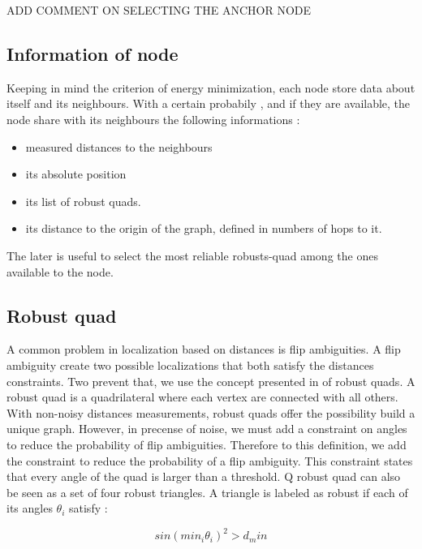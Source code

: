 \documentclass[letterpaper, 10 pt, conference]{ieeeconf}  %
\begin{document}
ADD COMMENT ON SELECTING THE ANCHOR NODE

\subsection{Information of node}

Keeping in mind the criterion of energy minimization, each node store data about itself and its neighbours. With a certain probabily , and if they are available, the node share with its neighbours the following informations :

\begin{itemize}

\item measured distances to the neighbours
\item its absolute position
\item its list of robust quads.
\item its distance to the origin of the graph, defined in numbers of hops to it.

\end{itemize}

The later is useful to select the most reliable robusts-quad among the ones available to the node.


\subsection{Robust quad}
A common problem in localization based on distances is flip ambiguities. A flip ambiguity create two possible localizations that both satisfy the distances constraints. Two prevent that, we use the concept presented in \cite{MooreTeller} of robust quads.
A robust quad is a quadrilateral where each vertex are connected with all others.
With non-noisy distances measurements, robust quads offer the possibility build a unique graph. However, in precense of noise, we must add a constraint on angles to reduce the probability of flip ambiguities.
Therefore to this definition, we add the constraint to reduce the probability of a flip ambiguity. This constraint states that every angle of the quad is larger than a threshold. 
Q robust quad can also be seen as a set of four robust triangles. A triangle is labeled as robust if each of its angles $\theta_i$ satisfy : 

\begin{equation}
sin(min_i \theta_i)^2 > d_min
\end{equation}
\end{document}
